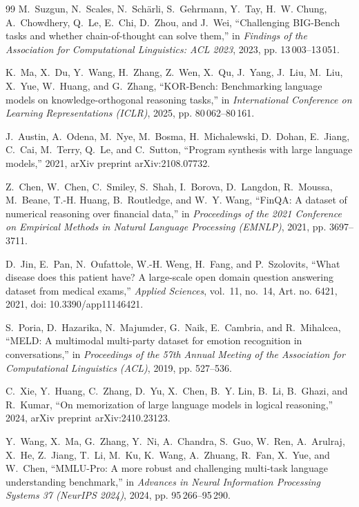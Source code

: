 \documentclass[lettersize,journal]{IEEEtran}
\begin{document}
\begin{thebibliography}{99}
M.~Suzgun, N.~Scales, N.~Sch{\"a}rli, S.~Gehrmann, Y.~Tay, H.~W. Chung, A.~Chowdhery, Q.~Le, E.~Chi, D.~Zhou, and J.~Wei, ``Challenging {BIG-Bench} tasks and whether chain-of-thought can solve them,'' in \emph{Findings of the Association for Computational Linguistics: ACL 2023}, 2023, pp. 13\,003--13\,051.

K.~Ma, X.~Du, Y.~Wang, H.~Zhang, Z.~Wen, X.~Qu, J.~Yang, J.~Liu, M.~Liu, X.~Yue, W.~Huang, and G.~Zhang, ``{KOR-Bench}: Benchmarking language models on knowledge-orthogonal reasoning tasks,'' in \emph{International Conference on Learning Representations (ICLR)}, 2025, pp. 80\,062--80\,161.

J.~Austin, A.~Odena, M.~Nye, M.~Bosma, H.~Michalewski, D.~Dohan, E.~Jiang, C.~Cai, M.~Terry, Q.~Le, and C.~Sutton, ``Program synthesis with large language models,'' 2021, arXiv preprint arXiv:2108.07732.

Z.~Chen, W.~Chen, C.~Smiley, S.~Shah, I.~Borova, D.~Langdon, R.~Moussa, M.~Beane, T.-H. Huang, B.~Routledge, and W.~Y. Wang, ``{FinQA}: A dataset of numerical reasoning over financial data,'' in \emph{Proceedings of the 2021 Conference on Empirical Methods in Natural Language Processing (EMNLP)}, 2021, pp. 3697--3711.

D.~Jin, E.~Pan, N.~Oufattole, W.-H. Weng, H.~Fang, and P.~Szolovits, ``What disease does this patient have? {A} large-scale open domain question answering dataset from medical exams,'' \emph{Applied Sciences}, vol.~11, no.~14, Art. no. 6421, 2021, doi: 10.3390/app11146421.

S.~Poria, D.~Hazarika, N.~Majumder, G.~Naik, E.~Cambria, and R.~Mihalcea, ``{MELD}: A multimodal multi-party dataset for emotion recognition in conversations,'' in \emph{Proceedings of the 57th Annual Meeting of the Association for Computational Linguistics (ACL)}, 2019, pp. 527--536.

C.~Xie, Y.~Huang, C.~Zhang, D.~Yu, X.~Chen, B.~Y. Lin, B.~Li, B.~Ghazi, and R.~Kumar, ``On memorization of large language models in logical reasoning,'' 2024, arXiv preprint arXiv:2410.23123.

Y.~Wang, X.~Ma, G.~Zhang, Y.~Ni, A.~Chandra, S.~Guo, W.~Ren, A.~Arulraj, X.~He, Z.~Jiang, T.~Li, M.~Ku, K.~Wang, A.~Zhuang, R.~Fan, X.~Yue, and W.~Chen, ``{MMLU-Pro}: A more robust and challenging multi-task language understanding benchmark,'' in \emph{Advances in Neural Information Processing Systems 37 (NeurIPS 2024)}, 2024, pp. 95\,266--95\,290.


\end{thebibliography}
\end{document}
